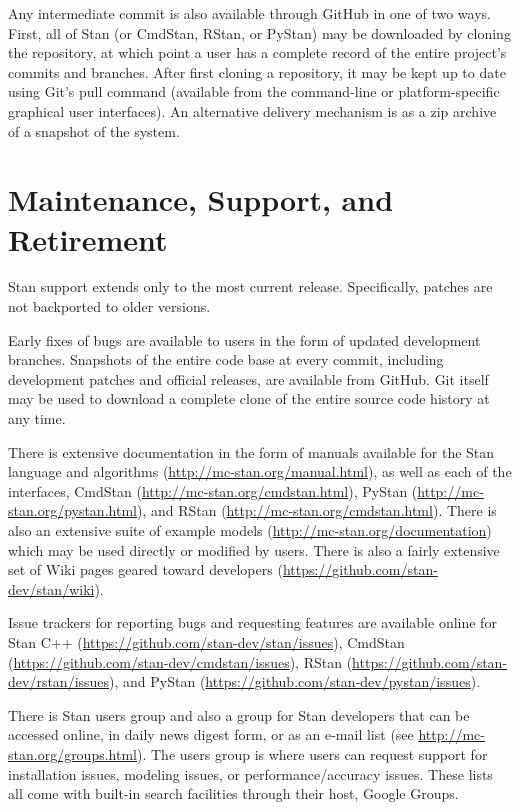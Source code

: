 Any intermediate commit is also available through GitHub in one of two
ways. First, all of Stan (or CmdStan, RStan, or PyStan) may be
downloaded by cloning the repository, at which point a user has a
complete record of the entire project's commits and branches. After
first cloning a repository, it may be kept up to date using Git's pull
command (available from the command-line or platform-specific
graphical user interfaces).   An alternative delivery mechanism is as
a zip archive of a snapshot of the system.  

\section{Maintenance, Support, and Retirement}

Stan support extends only to the most current release. Specifically,
patches are not backported to older versions.  

Early fixes of bugs are available to users in the form of updated
development branches. Snapshots of the entire code base at every
commit, including development patches and official releases, are
available from GitHub.  Git itself may be used to download a complete
clone of the entire source code history at any time.

There is extensive documentation in the form of manuals available for
the Stan language and algorithms
(\url{http://mc-stan.org/manual.html}), as well as each of the
interfaces, CmdStan (\url{http://mc-stan.org/cmdstan.html}), PyStan
(\url{http://mc-stan.org/pystan.html}), and RStan
(\url{http://mc-stan.org/cmdstan.html}). There is also an extensive
suite of example models (\url{http://mc-stan.org/documentation}) which
may be used directly or modified by users. There is also a fairly
extensive set of Wiki pages geared toward developers
(\url{https://github.com/stan-dev/stan/wiki}).

Issue trackers for reporting bugs and requesting features are
available online for Stan C++
(\url{https://github.com/stan-dev/stan/issues}), CmdStan
(\url{https://github.com/stan-dev/cmdstan/issues}), RStan
(\url{https://github.com/stan-dev/rstan/issues}), and PyStan
(\url{https://github.com/stan-dev/pystan/issues}).

There is Stan users group and also a group for Stan developers that
can be accessed online, in daily news digest form, or as an e-mail
list (see \url{http://mc-stan.org/groups.html}).  The users group is
where users can request support for installation issues, modeling
issues, or performance/accuracy issues.  These lists all come with
built-in search facilities through their host, Google Groups.

